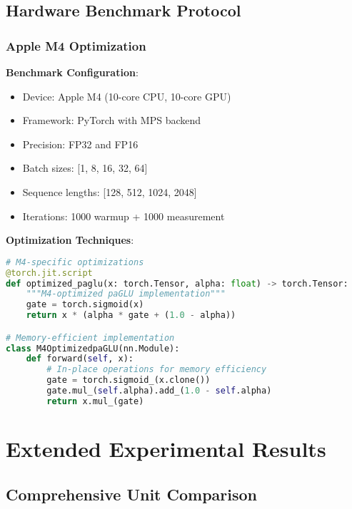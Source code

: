 \documentclass[journal]{IEEEtran}
\begin{document}
\subsection{Hardware Benchmark Protocol}

\subsubsection{Apple M4 Optimization}
\textbf{Benchmark Configuration}:
\begin{itemize}
    \item Device: Apple M4 (10-core CPU, 10-core GPU)
    \item Framework: PyTorch with MPS backend
    \item Precision: FP32 and FP16
    \item Batch sizes: [1, 8, 16, 32, 64]
    \item Sequence lengths: [128, 512, 1024, 2048]
    \item Iterations: 1000 warmup + 1000 measurement
\end{itemize}

\textbf{Optimization Techniques}:
\begin{lstlisting}[language=python]
# M4-specific optimizations
@torch.jit.script
def optimized_paglu(x: torch.Tensor, alpha: float) -> torch.Tensor:
    """M4-optimized paGLU implementation"""
    gate = torch.sigmoid(x)
    return x * (alpha * gate + (1.0 - alpha))

# Memory-efficient implementation
class M4OptimizedpaGLU(nn.Module):
    def forward(self, x):
        # In-place operations for memory efficiency
        gate = torch.sigmoid_(x.clone())
        gate.mul_(self.alpha).add_(1.0 - self.alpha)
        return x.mul_(gate)
\end{lstlisting}

\section{Extended Experimental Results}

\subsection{Comprehensive Unit Comparison}
\end{document}
